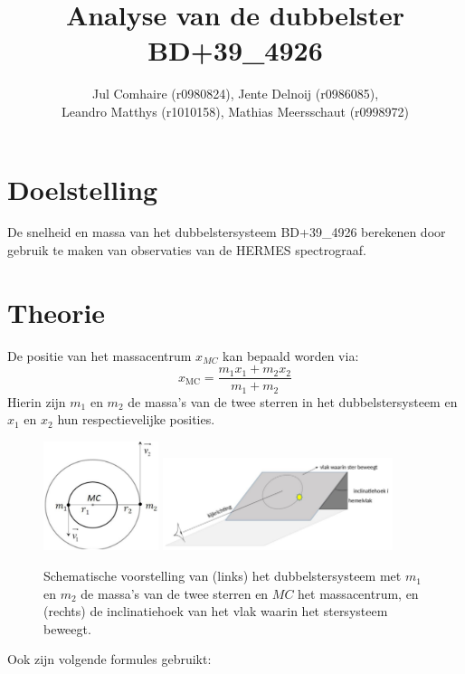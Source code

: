 \documentclass[12pt]{article}
\title{Analyse van de dubbelster BD+39\_4926}
\author{Jul Comhaire (r0980824), Jente Delnoij (r0986085),\\
	Leandro Matthys (r1010158), Mathias Meersschaut (r0998972)}
\begin{document}
	\maketitle
	\tableofcontents
	\pagebreak
	\section{Doelstelling}
	De snelheid en massa van het dubbelstersysteem BD+39\_4926 berekenen door gebruik te maken van observaties van de HERMES spectrograaf.
	\section{Theorie}
	De positie van het massacentrum $x_{MC}$ kan bepaald worden via:
	\begin{equation}
	   	x_{\text{MC}} = \frac{m_1x_1 + m_2x_2}{m_1 + m_2}
	\end{equation}
	Hierin zijn $m_1$ en $m_2$ de massa's van de twee sterren in het dubbelstersysteem en $x_1$ en $x_2$ hun respectievelijke posities.
	\begin{center}
		\begin{minipage}{1\textwidth}
			\begin{figure}[H]
				\centering
				\includegraphics[width=0.3\textwidth]{illustratie_dubbelster.png}
				\includegraphics[width=0.6\textwidth]{inclinatiehoek.PNG}
				\caption{Schematische voorstelling van (links) het dubbelstersysteem met $m_1$ en $m_2$ de massa's van de twee sterren en $MC$ het massacentrum, en (rechts) de inclinatiehoek van het vlak waarin het stersysteem beweegt.}
				\label{fig 1:Illustratie_dubbelster}
			\end{figure}
		\end{minipage}
	\end{center}
	Ook zijn volgende formules gebruikt:
\end{document}
